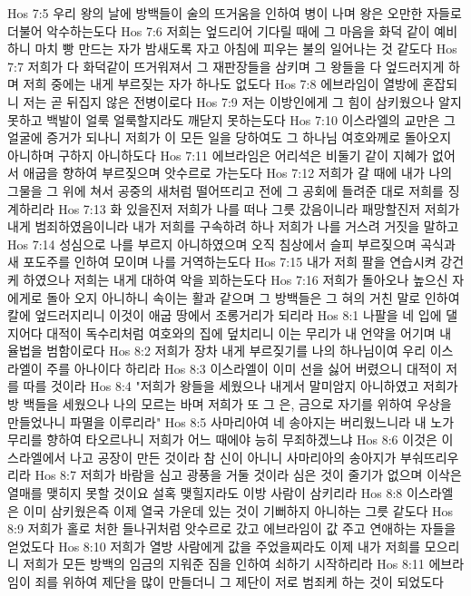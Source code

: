 Hos 7:5  우리 왕의 날에 방백들이 술의 뜨거움을 인하여 병이 나며 왕은 오만한 자들로 더불어 악수하는도다
Hos 7:6  저희는 엎드리어 기다릴 때에 그 마음을 화덕 같이 예비하니 마치 빵 만드는 자가 밤새도록 자고 아침에 피우는 불의 일어나는 것 같도다
Hos 7:7  저희가 다 화덕같이 뜨거워져서 그 재판장들을 삼키며 그 왕들을 다 엎드러지게 하며 저희 중에는 내게 부르짖는 자가 하나도 없도다
Hos 7:8  에브라임이 열방에 혼잡되니 저는 곧 뒤집지 않은 전병이로다
Hos 7:9  저는 이방인에게 그 힘이 삼키웠으나 알지 못하고 백발이 얼룩 얼룩할지라도 깨닫지 못하는도다
Hos 7:10  이스라엘의 교만은 그 얼굴에 증거가 되나니 저희가 이 모든 일을 당하여도 그 하나님 여호와께로 돌아오지 아니하며 구하지 아니하도다
Hos 7:11  에브라임은 어리석은 비둘기 같이 지혜가 없어서 애굽을 향하여 부르짖으며 앗수르로 가는도다
Hos 7:12  저희가 갈 때에 내가 나의 그물을 그 위에 쳐서 공중의 새처럼 떨어뜨리고 전에 그 공회에 들려준 대로 저희를 징계하리라
Hos 7:13  화 있을진저 저희가 나를 떠나 그릇 갔음이니라 패망할진저 저희가 내게 범죄하였음이니라 내가 저희를 구속하려 하나 저희가 나를 거스려 거짓을 말하고
Hos 7:14  성심으로 나를 부르지 아니하였으며 오직 침상에서 슬피 부르짖으며 곡식과 새 포도주를 인하여 모이며 나를 거역하는도다
Hos 7:15  내가 저희 팔을 연습시켜 강건케 하였으나 저희는 내게 대하여 악을 꾀하는도다
Hos 7:16  저희가 돌아오나 높으신 자에게로 돌아 오지 아니하니 속이는 활과 같으며 그 방백들은 그 혀의 거친 말로 인하여 칼에 엎드러지리니 이것이 애굽 땅에서 조롱거리가 되리라
Hos 8:1  나팔을 네 입에 댈지어다 대적이 독수리처럼 여호와의 집에 덮치리니 이는 무리가 내 언약을 어기며 내 율법을 범함이로다
Hos 8:2  저희가 장차 내게 부르짖기를 나의 하나님이여 우리 이스라엘이 주를 아나이다 하리라
Hos 8:3  이스라엘이 이미 선을 싫어 버렸으니 대적이 저를 따를 것이라
Hos 8:4  "저희가 왕들을 세웠으나 내게서 말미암지 아니하였고 저희가 방 백들을 세웠으나 나의 모르는 바며 저희가 또 그 은, 금으로 자기를 위하여 우상을 만들었나니 파멸을 이루리라"
Hos 8:5  사마리아여 네 송아지는 버리웠느니라 내 노가 무리를 향하여 타오르나니 저희가 어느 때에야 능히 무죄하겠느냐
Hos 8:6  이것은 이스라엘에서 나고 공장이 만든 것이라 참 신이 아니니 사마리아의 송아지가 부숴뜨리우리라
Hos 8:7  저희가 바람을 심고 광풍을 거둘 것이라 심은 것이 줄기가 없으며 이삭은 열매를 맺히지 못할 것이요 설혹 맺힐지라도 이방 사람이 삼키리라
Hos 8:8  이스라엘은 이미 삼키웠은즉 이제 열국 가운데 있는 것이 기뻐하지 아니하는 그릇 같도다
Hos 8:9  저희가 홀로 처한 들나귀처럼 앗수르로 갔고 에브라임이 값 주고 연애하는 자들을 얻었도다
Hos 8:10  저희가 열방 사람에게 값을 주었을찌라도 이제 내가 저희를 모으리니 저희가 모든 방백의 임금의 지워준 짐을 인하여 쇠하기 시작하리라
Hos 8:11  에브라임이 죄를 위하여 제단을 많이 만들더니 그 제단이 저로 범죄케 하는 것이 되었도다
